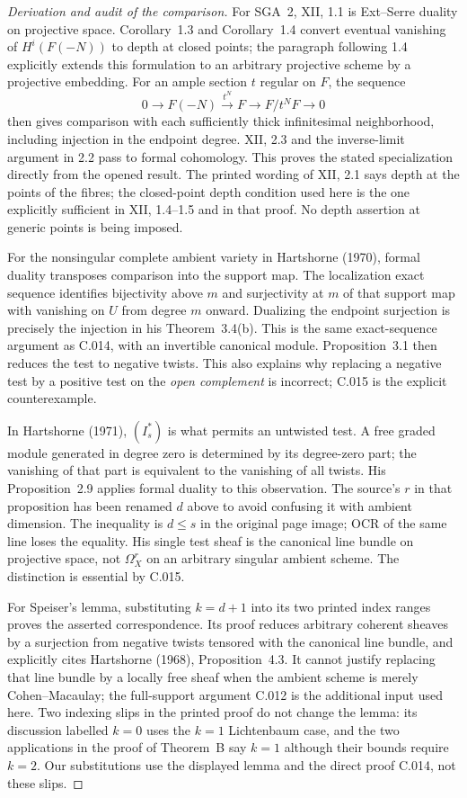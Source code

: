 \begin{proof}[Derivation and audit of the comparison]
For SGA~2, XII, 1.1 is Ext--Serre duality on projective space.
Corollary~1.3 and Corollary~1.4 convert eventual vanishing of
$H^i(F(-N))$ to depth at closed points; the paragraph following
1.4 explicitly extends this formulation to an arbitrary
projective scheme by a projective embedding. For an ample
section $t$ regular on $F$, the sequence
\[
 0\longrightarrow F(-N)\xrightarrow{t^N}F
 \longrightarrow F/t^NF\longrightarrow0
\]
then gives comparison with each sufficiently thick infinitesimal
neighborhood, including injection in the endpoint degree.
XII, 2.3 and the inverse-limit argument in 2.2 pass to formal
cohomology. This proves the stated specialization directly from
the opened result. The printed wording of XII, 2.1 says depth
at the points of the fibres; the closed-point depth condition
used here is the one explicitly sufficient in XII, 1.4--1.5
and in that proof. No depth assertion at generic points is
being imposed.

For the nonsingular complete ambient variety in Hartshorne
(1970), formal duality transposes comparison into the support
map. The localization exact sequence identifies bijectivity
above $m$ and surjectivity at $m$ of that support map with
vanishing on $U$ from degree $m$ onward. Dualizing the
endpoint surjection is precisely the injection in his
Theorem~3.4(b). This is the same exact-sequence argument as
C.014, with an invertible canonical module. Proposition~3.1
then reduces the test to negative twists. This also explains
why replacing a negative test by a positive test on the
\emph{open complement} is incorrect; C.015 is the explicit
counterexample.

In Hartshorne (1971), $(I_s^*)$ is what permits an untwisted
test. A free graded module generated in degree zero is
determined by its degree-zero part; the vanishing of that
part is equivalent to the vanishing of all twists. His
Proposition~2.9 applies formal duality to this observation.
The source's $r$ in that proposition has been renamed $d$
above to avoid confusing it with ambient dimension. The
inequality is $d\leq s$ in the original page image; OCR of
the same line loses the equality. His single test sheaf is
the canonical line bundle on projective space, not
$\Omega_X^r$ on an arbitrary singular ambient scheme.
The distinction is essential by C.015.

For Speiser's lemma, substituting $k=d+1$ into its two
printed index ranges proves the asserted correspondence.
Its proof reduces arbitrary coherent sheaves by a surjection
from negative twists tensored with the canonical line bundle,
and explicitly cites Hartshorne (1968), Proposition~4.3.
It cannot justify replacing that line bundle by a locally
free sheaf when the ambient scheme is merely
Cohen--Macaulay; the full-support argument C.012 is the
additional input used here. Two indexing slips in the
printed proof do not change the lemma: its discussion
labelled $k=0$ uses the $k=1$ Lichtenbaum case, and the
two applications in the proof of Theorem~B say $k=1$
although their bounds require $k=2$. Our substitutions
use the displayed lemma and the direct proof C.014,
not these slips.


\end{proof}
